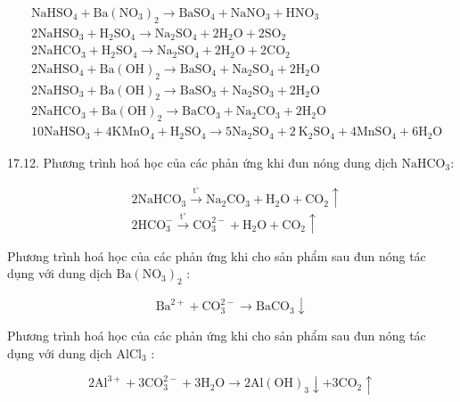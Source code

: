 \documentclass[10pt]{article}
\begin{document}
$$
\begin{aligned}
& \mathrm{NaHSO}_{4}+\mathrm{Ba}\left(\mathrm{NO}_{3}\right)_{2} \rightarrow \mathrm{BaSO}_{4}+\mathrm{NaNO}_{3}+\mathrm{HNO}_{3} \\
& 2 \mathrm{NaHSO}_{3}+\mathrm{H}_{2} \mathrm{SO}_{4} \rightarrow \mathrm{Na}_{2} \mathrm{SO}_{4}+2 \mathrm{H}_{2} \mathrm{O}+2 \mathrm{SO}_{2} \\
& 2 \mathrm{NaHCO}_{3}+\mathrm{H}_{2} \mathrm{SO}_{4} \rightarrow \mathrm{Na}_{2} \mathrm{SO}_{4}+2 \mathrm{H}_{2} \mathrm{O}+2 \mathrm{CO}_{2} \\
& 2 \mathrm{NaHSO}_{4}+\mathrm{Ba}(\mathrm{OH})_{2} \rightarrow \mathrm{BaSO}_{4}+\mathrm{Na}_{2} \mathrm{SO}_{4}+2 \mathrm{H}_{2} \mathrm{O} \\
& 2 \mathrm{NaHSO}_{3}+\mathrm{Ba}(\mathrm{OH})_{2} \rightarrow \mathrm{BaSO}_{3}+\mathrm{Na}_{2} \mathrm{SO}_{3}+2 \mathrm{H}_{2} \mathrm{O} \\
& 2 \mathrm{NaHCO}_{3}+\mathrm{Ba}(\mathrm{OH})_{2} \rightarrow \mathrm{BaCO}_{3}+\mathrm{Na}_{2} \mathrm{CO}_{3}+2 \mathrm{H}_{2} \mathrm{O} \\
& 10 \mathrm{NaHSO}_{3}+4 \mathrm{KMnO}_{4}+\mathrm{H}_{2} \mathrm{SO}_{4} \rightarrow 5 \mathrm{Na}_{2} \mathrm{SO}_{4}+2 \mathrm{~K}_{2} \mathrm{SO}_{4}+4 \mathrm{MnSO}_{4}+6 \mathrm{H}_{2} \mathrm{O}
\end{aligned}
$$

17.12. Phương trình hoá học của các phản ứng khi đun nóng dung dịch $\mathrm{NaHCO}_{3}:$

$$
\begin{aligned}
& 2 \mathrm{NaHCO}_{3} \xrightarrow{\mathrm{t}^{\circ}} \mathrm{Na}_{2} \mathrm{CO}_{3}+\mathrm{H}_{2} \mathrm{O}+\mathrm{CO}_{2} \uparrow \\
& 2 \mathrm{HCO}_{3}^{-} \xrightarrow{\mathrm{t}^{\circ}} \mathrm{CO}_{3}^{2-}+\mathrm{H}_{2} \mathrm{O}+\mathrm{CO}_{2} \uparrow
\end{aligned}
$$

Phương trình hoá học của các phản ứng khi cho sản phẩm sau đun nóng tác dụng với dung dịch $\mathrm{Ba}\left(\mathrm{NO}_{3}\right)_{2}$ :

$$
\mathrm{Ba}^{2+}+\mathrm{CO}_{3}^{2-} \rightarrow \mathrm{BaCO}_{3} \downarrow
$$

Phương trình hoá học của các phản ứng khi cho sản phẩm sau đun nóng tác dụng với dung dịch $\mathrm{AlCl}_{3}$ :

$$
2 \mathrm{Al}^{3+}+3 \mathrm{CO}_{3}^{2-}+3 \mathrm{H}_{2} \mathrm{O} \rightarrow 2 \mathrm{Al}(\mathrm{OH})_{3} \downarrow+3 \mathrm{CO}_{2} \uparrow
$$
\end{document}

